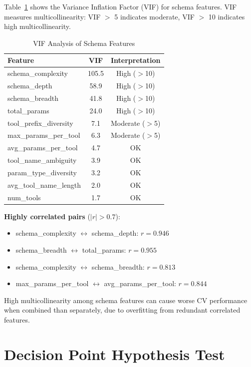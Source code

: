 \documentclass[sigconf,anonymous,review]{acmart}
\begin{document}
Table~\ref{tab:vif} shows the Variance Inflation Factor (VIF) for schema features. VIF measures multicollinearity: VIF $>$ 5 indicates moderate, VIF $>$ 10 indicates high multicollinearity.

\begin{table}[h]
\centering
\caption{VIF Analysis of Schema Features}
\label{tab:vif}
\small
\begin{tabular}{@{}lcc@{}}
\toprule
\textbf{Feature} & \textbf{VIF} & \textbf{Interpretation} \\
\midrule
schema\_complexity & 105.5 & High ($>$10) \\
schema\_depth & 58.9 & High ($>$10) \\
schema\_breadth & 41.8 & High ($>$10) \\
total\_params & 24.0 & High ($>$10) \\
tool\_prefix\_diversity & 7.1 & Moderate ($>$5) \\
max\_params\_per\_tool & 6.3 & Moderate ($>$5) \\
avg\_params\_per\_tool & 4.7 & OK \\
tool\_name\_ambiguity & 3.9 & OK \\
param\_type\_diversity & 3.2 & OK \\
avg\_tool\_name\_length & 2.0 & OK \\
num\_tools & 1.7 & OK \\
\bottomrule
\end{tabular}
\end{table}

\textbf{Highly correlated pairs} ($|r| > 0.7$):
\begin{itemize}
    \item schema\_complexity $\leftrightarrow$ schema\_depth: $r = 0.946$
    \item schema\_breadth $\leftrightarrow$ total\_params: $r = 0.955$
    \item schema\_complexity $\leftrightarrow$ schema\_breadth: $r = 0.813$
    \item max\_params\_per\_tool $\leftrightarrow$ avg\_params\_per\_tool: $r = 0.844$
\end{itemize}

High multicollinearity among schema features can cause worse CV performance when combined than separately, due to overfitting from redundant correlated features.

\section{Decision Point Hypothesis Test}
\label{app:decision_point}
\end{document}
